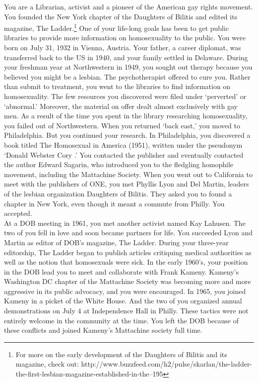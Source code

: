 You are a Librarian, activist and a pioneer of the American gay rights movement. You founded the New York chapter of the Daughters of Bilitis and edited its magazine, The Ladder.\footnote{For more on the early development of the Daughters of Bilitis and its magazine, check out: http:\slash \slash www.buzzfeed.com\slash h2\slash pulse\slash skarlan\slash the-ladder-the-first-lesbian-magazine-established-in-the--195} One of your life-long goals has been to get public libraries to provide more information on homosexuality to the public.
You were born on July 31, 1932 in Vienna, Austria. Your father, a career diplomat, was transferred back to the US in 1940, and your family settled in Delaware.
During your freshman year at Northwestern in 1949, you sought out therapy because you believed you might be a lesbian. The psychotherapist offered to cure you. Rather than submit to treatment, you went to the libraries to find information on homosexuality. The few resources you discovered were filed under `perverted' or `abnormal.' Moreover, the material on offer dealt almost exclusively with gay men.
As a result of the time you spent in the library researching homosexuality, you failed out of Northwestern. When you returned `back east,' you moved to Philadelphia.
But you continued your research. In Philadelphia, you discovered a book titled The Homosexual in America (1951), written under the pseudonym `Donald Webster Cory .' You contacted the publisher and eventually contacted the author Edward Sagarin, who introduced you to the fledgling homophile movement, including the Mattachine Society.
When you went out to California to meet with the publishers of ONE, you met Phyllis Lyon and Del Martin, leaders of the lesbian organization Daughters of Bilitis. They asked you to found a chapter in New York, even though it meant a commute from Philly. You accepted.\\
At a DOB meeting in 1961, you met another activist named Kay Lahusen. The two of you fell in love and soon became partners for life.
You succeeded Lyon and Martin as editor of DOB's magazine, The Ladder. During your three-year editorship, The Ladder began to publish articles critiquing medical authorities as well as the notion that homosexuals were sick.
In the early 1960's, your position in the DOB lead you to meet and collaborate with Frank Kameny. Kameny's Washington DC chapter of the Mattachine Society was becoming more and more aggressive in its public advocacy, and you were encouraged. In 1965, you joined Kameny in a picket of the White House. And the two of you organized annual demonstrations on July 4 at Independence Hall in Philly.
These tactics were not entirely welcome in the community at the time. You left the DOB because of these conflicts and joined Kameny's Mattachine society full time.


